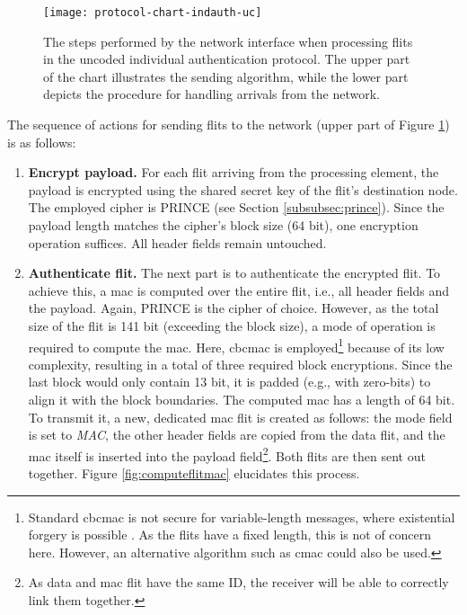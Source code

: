 \begin{figure}
    \centering
    \texttt{[image: protocol-chart-indauth-uc]}
    \caption[Uncoded ind. auth., detailed procedure]{The steps performed by the network interface when processing flits in the uncoded individual
    authentication protocol. The upper part of the chart illustrates the sending algorithm, while the lower part depicts the procedure for handling
    arrivals from the network.}
    \label{fig:protchartindauthuc}
\end{figure}

The sequence of actions for sending flits to the network (upper part of Figure \ref{fig:protchartindauthuc}) is as follows:
\begin{enumerate}
    \item \textbf{Encrypt payload.} For each flit arriving from the processing element, the payload is encrypted using the shared secret key of the
        flit's destination node. The employed cipher is PRINCE (see Section \ref{subsubsec:prince}). Since the payload length matches the cipher's
        block size (64 bit), one encryption operation suffices. All header fields remain untouched.
    \item \textbf{Authenticate flit.} The next part is to authenticate the encrypted flit. To achieve this, a \gls{mac} is computed over the entire
        flit, i.e., all header fields and the payload. Again, PRINCE is the cipher of choice. However, as the total size of the flit is 141 bit
        (exceeding the block size), a mode of operation is required to compute the \gls{mac}. Here, \gls{cbcmac} is employed\footnote{Standard
        \gls{cbcmac} is not secure for variable-length messages, where existential forgery is possible \cite{wikilengthextattack}. As the flits have a
        fixed length, this is not of concern here. However, an alternative algorithm such as \gls{cmac} could also be used.} because of its low
        complexity, resulting in a total of three required block encryptions. Since the last block would only contain 13 bit, it is
        padded (e.g., with zero-bits) to align it with the block boundaries. The computed \gls{mac} has a length of 64 bit. To transmit it, a new, dedicated
        \gls{mac} flit is created as follows: the mode field is set to \textit{MAC}, the other header fields are copied from the data flit, and the
        \gls{mac} itself is inserted into the payload field\footnote{As data and \gls{mac} flit have the same ID, the receiver will be able to
        correctly link them together.}. Both flits are then sent out together. Figure \vref{fig:computeflitmac} elucidates this process.

\end{enumerate}
